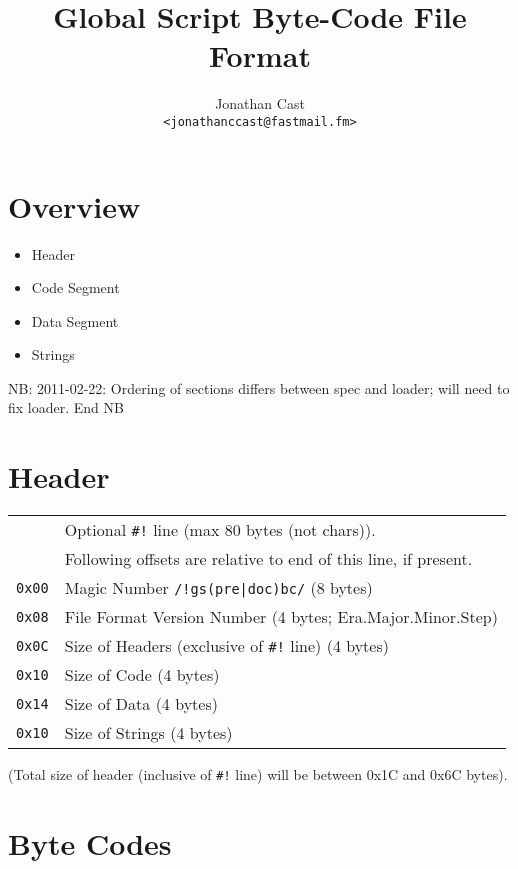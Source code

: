 \documentclass{article}
\title{Global Script Byte-Code File Format}
\author{Jonathan Cast\\\texttt{<jonathanccast@fastmail.fm>}}
\begin{document}
\maketitle

\section{Overview}

\begin{itemize}
  \item Header
  \item Code Segment
  \item Data Segment
  \item Strings
\end{itemize}
NB: 2011-02-22: Ordering of sections differs between spec and loader; will need to fix loader.  End NB

\section{Header}

\begin{tabular}{cl}
  & Optional \verb+#!+ line (max 80 bytes (not chars)). \\
  & Following offsets are relative to end of this line, if present.  \\
\texttt{0x00} & Magic Number \verb+/!gs(pre|doc)bc/+ (8 bytes) \\
\texttt{0x08} & File Format Version Number (4 bytes; Era.Major.Minor.Step) \\
\texttt{0x0C} & Size of Headers (exclusive of \verb+#!+ line) (4 bytes) \\
\texttt{0x10} & Size of Code (4 bytes) \\
\texttt{0x14} & Size of Data (4 bytes) \\
\texttt{0x10} & Size of Strings (4 bytes) \\
\end{tabular}

(Total size of header (inclusive of \verb+#!+ line) will be between 0x1C and 0x6C bytes).

\section {Byte Codes}
\end{document}

